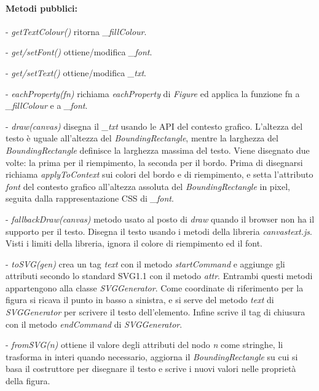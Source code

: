 \paragraph{Metodi pubblici:}
\begin{elencopuntato}[\subsubsecindent]
\item[-] \textit{getTextColour()} ritorna \textit{{\_}fillColour}.
\item[-] \textit{get/setFont()} ottiene/modifica \textit{{\_}font}.
\item[-] \textit{get/setText()} ottiene/modifica \textit{{\_}txt}.
\item[-] \textit{eachProperty(fn)} richiama \textit{eachProperty} di \textit{Figure} ed applica la funzione fn a \textit{{\_}fillColour} e a \textit{{\_}font}.
\item[-] \textit{draw(canvas)} disegna il \textit{{\_}txt} usando le API del contesto grafico. L'altezza del testo \`e uguale all'altezza del \textit{BoundingRectangle}, mentre la larghezza del \textit{BoundingRectangle} definisce la larghezza massima del testo. Viene disegnato due volte: la prima per il riempimento, la seconda per il bordo. Prima di disegnarsi richiama \textit{applyToContext} sui colori del bordo e di riempimento, e setta l'attributo \textit{font} del contesto grafico all'altezza assoluta del \textit{BoundingRectangle} in pixel, seguita dalla rappresentazione CSS di \textit{{\_}font}.
\item[-] \textit{fallbackDraw(canvas)} metodo usato al posto di \textit{draw} quando il browser non ha il supporto per il testo. Disegna il testo usando i metodi della libreria \textit{canvastext.js}. Visti i limiti della libreria, ignora il colore di riempimento ed il font.
\item[-] \textit{toSVG(gen)} crea un tag \textit{text} con il metodo \textit{startCommand} e aggiunge gli attributi secondo lo standard SVG1.1 con il metodo \textit{attr}. Entrambi questi metodi appartengono alla classe \textit{SVGGenerator}. Come coordinate di riferimento per la figura si ricava il punto in basso a sinistra, e si serve del metodo \textit{text} di \textit{SVGGenerator} per scrivere il testo dell'elemento. Infine scrive il tag di chiusura con il metodo \textit{endCommand} di \textit{SVGGenerator}.
\item[-] \textit{fromSVG(n)} ottiene il valore degli attributi del nodo \textit{n} come stringhe, li trasforma in interi quando necessario, aggiorna il \textit{BoundingRectangle} su cui si basa il costruttore per disegnare il testo e scrive i nuovi valori nelle propriet\`a della figura.  
\end{elencopuntato}

